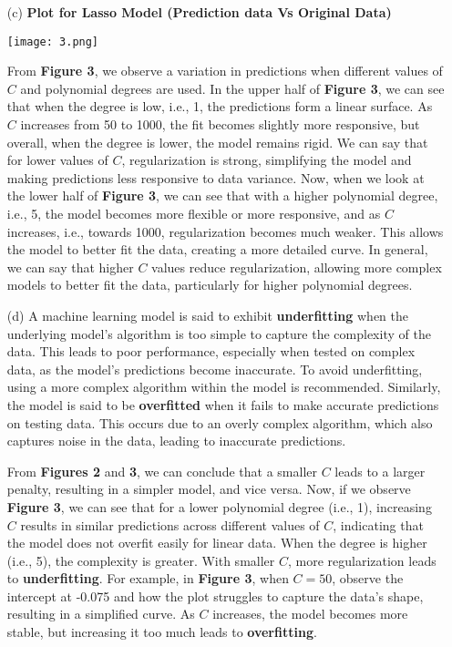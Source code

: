 \documentclass[a4paper,10pt]{article}
\begin{document}
\begin{enumerate}
\item[(c)] \textbf{Plot for Lasso Model (Prediction data Vs Original Data)}
\begin{center}
        \centering
        \texttt{[image: 3.png]}
    \end{center}
    From \textbf{Figure 3}, we observe a variation in predictions when different values of \(C\) and polynomial degrees are used. In the upper half of \textbf{Figure 3}, we can see that when the degree is low, i.e., 1, the predictions form a linear surface. As \(C\) increases from 50 to 1000, the fit becomes slightly more responsive, but overall, when the degree is lower, the model remains rigid. We can say that for lower values of \(C\), regularization is strong, simplifying the model and making predictions less responsive to data variance. Now, when we look at the lower half of \textbf{Figure 3}, we can see that with a higher polynomial degree, i.e., 5, the model becomes more flexible or more responsive, and as \(C\) increases, i.e., towards 1000, regularization becomes much weaker. This allows the model to better fit the data, creating a more detailed curve. In general, we can say that higher \(C\) values reduce regularization, allowing more complex models to better fit the data, particularly for higher polynomial degrees.
\item[(d)]
A machine learning model is said to exhibit \textbf{underfitting} when the underlying model's algorithm is too simple to capture the complexity of the data. This leads to poor performance, especially when tested on complex data, as the model's predictions become inaccurate. To avoid underfitting, using a more complex algorithm within the model is recommended. Similarly, the model is said to be \textbf{overfitted} when it fails to make accurate predictions on testing data. This occurs due to an overly complex algorithm, which also captures noise in the data, leading to inaccurate predictions.

From \textbf{Figures 2} and \textbf{3}, we can conclude that a smaller $C$ leads to a larger penalty, resulting in a simpler model, and vice versa. Now, if we observe \textbf{Figure 3}, we can see that for a lower polynomial degree (i.e., 1), increasing $C$ results in similar predictions across different values of $C$, indicating that the model does not overfit easily for linear data. When the degree is higher (i.e., 5), the complexity is greater. With smaller $C$, more regularization leads to \textbf{underfitting}. For example, in \textbf{Figure 3}, when $C = 50$, observe the intercept at -0.075 and how the plot struggles to capture the data's shape, resulting in a simplified curve. As $C$ increases, the model becomes more stable, but increasing it too much leads to \textbf{overfitting}.


\end{enumerate}
\end{document}
